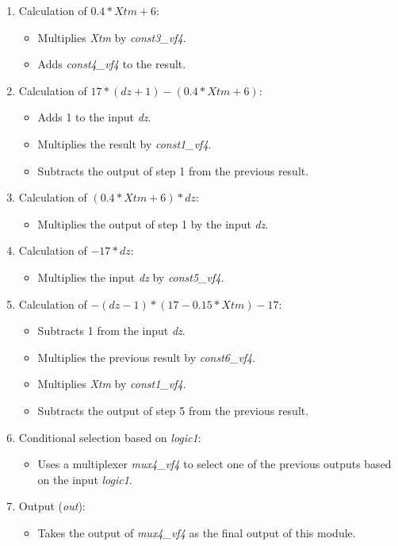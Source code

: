 \documentclass{article}
\begin{document}
\begin{enumerate}

\item Calculation of $0.4 * Xtm + 6$:
\begin{itemize}
\item Multiplies \textit{Xtm} by \textit{const3\_vf4}.
\item Adds \textit{const4\_vf4} to the result.
\end{itemize}

\item Calculation of  $17 * (dz + 1) - (0.4 * Xtm + 6)$:
\begin{itemize}
\item Adds 1 to the input \textit{dz}.
\item Multiplies the result by \textit{const1\_vf4}.
\item Subtracts the output of step 1 from the previous result.
\end{itemize}

\item Calculation of  $(0.4 * Xtm + 6) * dz$:
\begin{itemize}
\item Multiplies the output of step 1 by the input \textit{dz}.
\end{itemize}

\item Calculation of  $-17 * dz$:
\begin{itemize}
\item Multiplies the input \textit{dz} by \textit{const5\_vf4}.
\end{itemize}

\item Calculation of  $-(dz - 1) * (17 - 0.15 * Xtm) - 17$:
\begin{itemize}
\item Subtracts 1 from the input \textit{dz}.
\item Multiplies the previous result by \textit{const6\_vf4}.
\item Multiplies \textit{Xtm} by \textit{const1\_vf4}.
\item Subtracts the output of step 5 from the previous result.
\end{itemize}

\item Conditional selection based on \textit{logic1}:
\begin{itemize}
\item Uses a multiplexer \textit{mux4\_vf4} to select one of the previous outputs based on the input \textit{logic1}.
\end{itemize}

\item Output (\textit{out}):
\begin{itemize}
\item Takes the output of \textit{mux4\_vf4} as the final output of this module.
\end{itemize}

\end{enumerate}
\end{document}

